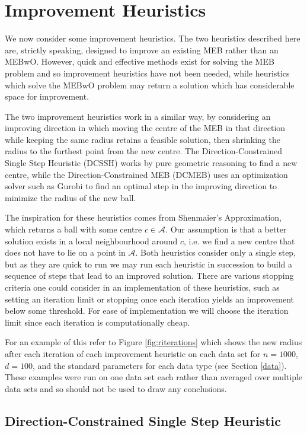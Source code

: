 \documentclass[11pt,twoside]{report}
\newcommand{\A}{\mathcal{A}} %
\theoremstyle{definition}
\numberwithin{theorem}{section}
\numberwithin{definition}{section}
\numberwithin{lemma}{section}
\numberwithin{proposition}{section}
\numberwithin{equation}{section}
\numberwithin{figure}{section}
\begin{document}
\section{Improvement Heuristics}\label{sec:improvement_heuristics}
We now consider some improvement heuristics. The two heuristics described here are, strictly speaking, designed to improve an existing MEB rather than an MEBwO. However, quick and effective methods exist for solving the MEB problem and so improvement heuristics have not been needed, while heuristics which solve the MEBwO problem may return a solution which has considerable space for improvement.

The two improvement heuristics work in a similar way, by considering an improving direction in which moving the centre of the MEB in that direction while keeping the same radius retains a feasible solution, then shrinking the radius to the furthest point from the new centre. The Direction-Constrained Single Step Heuristic (DCSSH) works by pure geometric reasoning to find a new centre, while the Direction-Constrained MEB (DCMEB) uses an optimization solver such as Gurobi to find an optimal step in the improving direction to minimize the radius of the new ball.

The inspiration for these heuristics comes from Shenmaier's Approximation, which returns a ball with some centre $c\in\A$. Our assumption is that a better solution exists in a local neighbourhood around $c$, i.e. we find a new centre that does not have to lie on a point in $\A$. Both heuristics consider only a single step, but as they are quick to run we may run each heuristic in succession to build a sequence of steps that lead to an improved solution. There are various stopping criteria one could consider in an implementation of these heuristics, such as setting an iteration limit or stopping once each iteration yields an improvement below some threshold. For ease of implementation we will choose the iteration limit since each iteration is computationally cheap.

For an example of this refer to Figure \ref{fig:riterations} which shows the new radius after each iteration of each improvement heuristic on each data set for $n=1000$, $d=100$, and the standard parameters for each data type (see Section \ref{data}). These examples were run on one data set each rather than averaged over multiple data sets and so should not be used to draw any conclusions.

\subsection{Direction-Constrained Single Step Heuristic}
\end{document}

